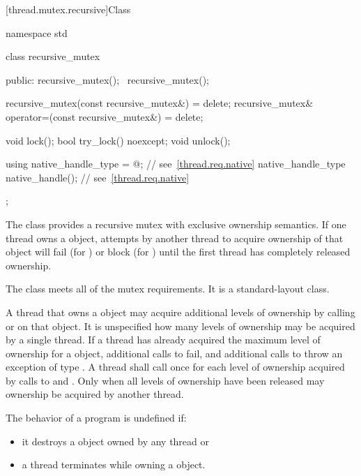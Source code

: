 [thread.mutex.recursive]{Class }

%
\begin{codeblock}
namespace std {
  class recursive_mutex {
  public:
    recursive_mutex();
    ~recursive_mutex();

    recursive_mutex(const recursive_mutex&) = delete;
    recursive_mutex& operator=(const recursive_mutex&) = delete;

    void lock();
    bool try_lock() noexcept;
    void unlock();

    using native_handle_type = @\impdefnc@;          // see~\ref{thread.req.native}
    native_handle_type native_handle();                         // see~\ref{thread.req.native}
  };
}
\end{codeblock}

\pnum
{}%
The class  provides a recursive mutex with exclusive ownership
semantics. If one thread owns a  object, attempts by another
thread to acquire ownership of that object will fail (for ) or block
(for ) until the first thread has completely released ownership.

\pnum
The class  meets
all of the mutex requirements.
It is a standard-layout class.

\pnum
A thread that owns a  object may acquire additional levels of
ownership by calling  or  on that object. It is
unspecified how many levels of ownership may be acquired by a single thread. If a thread
has already acquired the maximum level of ownership for a 
object, additional calls to  fail, and additional calls to
 throw an exception of type . A thread
shall call  once for each level of ownership acquired by calls to
 and . Only when all levels of ownership have been
released may ownership be acquired by another thread.

\pnum
The behavior of a program is undefined if:
\begin{itemize}
\item it destroys a  object owned by any thread or
\item a thread terminates while owning a  object.
\end{itemize}

